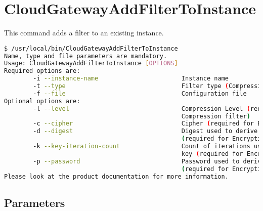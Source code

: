 \documentclass[11pt,fleqn,openany]{book} %
\begin{document}
\clearpage

\section*{CloudGatewayAddFilterToInstance}
\label{sec:cloudgatewayaddfiltertoinstance}

This command adds a filter to an existing instance.

\begin{lstlisting}[language=bash]
$ /usr/local/bin/CloudGatewayAddFilterToInstance
Name, type and file parameters are mandatory.
Usage: CloudGatewayAddFilterToInstance [OPTIONS]
Required options are:
        -i --instance-name                       Instance name
        -t --type                                Filter type (Compression, Encryption)
        -f --file                                Configuration file
Optional options are:
        -l --level                               Compression Level (required for
                                                 Compression filter)
        -c --cipher                              Cipher (required for Encryption filter)
        -d --digest                              Digest used to derive an encryption key
                                                 (required for Encryption filter)
        -k --key-iteration-count                 Count of iterations used to derive an encryption
                                                 key (required for Encryption filter)
        -p --password                            Password used to derive an encryption key
                                                 (required for Encryption filter)
Please look at the product documentation for more information.
\end{lstlisting}

\subsection*{Parameters}
\end{document}
